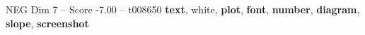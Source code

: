\begin{textsample}{NEG Dim 7 – Score -7.00 – t008650}  \label{ex:f7_neg_018}
\textbf{text}, white, \textbf{plot}, \textbf{font}, \textbf{number}, \textbf{diagram}, \textbf{slope}, \textbf{screenshot}

\end{textsample}
